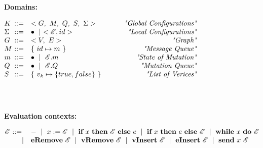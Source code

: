 \begin{figure}[h]

\textbf{Domains:}\\
\begin{center}

$\begin{array}{@{}l@{~}l@{\quad}l@{\!\!\!\!\!\!}r}
  K & ::= & <G,~M,~Q,~S,~\Sigma> & \hspace{15mm} \emph{"Global Configurations"} \\
  \Sigma & ::= & \bullet~\mid~<\mathscr{E}, id>  & \hspace{15mm} \emph{"Local Configurations"} \\
  G & ::= & <V,~E> & \hspace{30mm} \emph{"Graph"}\\
  M & ::= & \{~id \mapsto m~\}  & \hspace{15mm}  \emph{"Message Queue"}\\
  m & ::= & \bullet~\mid~\mathscr{E}.m & \hspace{15mm}  \emph{"State of Mutation"}\\
  Q & ::= & \bullet~\mid~\mathscr{E}.Q  & \hspace{15mm}  \emph{"Mutation Queue"} \\
  S & ::= & \{~v_k \mapsto \{true, false\}~\}  & \hspace{15mm}  \emph{"List of Verices"}\\
\end{array}
$
\end{center}

$\begin{array}{@{}l@{~}l@{\quad}l@{\!\!\!\!\!\!}r}
\ \\
\ \\
\end{array}
$


\textbf{Evaluation contexts:}\\
\begin{center}

$\begin{array}{@{}l@{~}l@{\quad}l@{\!\!\!\!\!\!}r}
 \mathscr{E} &  ::= & \hole~\mid~x:=\mathscr{E}~\mid~\textbf{if}~x~\textbf{then}~\mathscr{E}~\textbf{else}~e~\mid~\textbf{if}~x~\textbf{then}~e~\textbf{else}~\mathscr{E}~\mid~\textbf{while}~x~\textbf{do}~\mathscr{E} \\
&\ \ \ \   \mid & \textbf{eRemove}~\mathscr{E}~\mid~\textbf{vRemove}~\mathscr{E}~\mid~\textbf{vInsert}~\mathscr{E}~\mid~\textbf{eInsert}~\mathscr{E}~\mid~\textbf{send}~x~\mathscr{E}\\
\end{array}
$
\end{center}


\end{figure}
